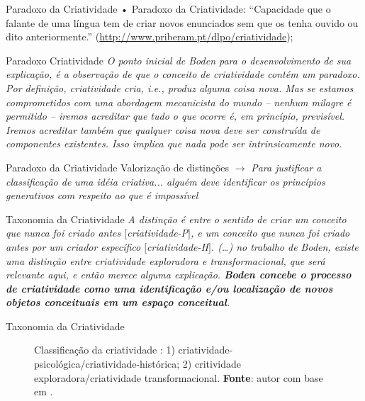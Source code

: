 \documentclass[aspectratio=169]{beamer}
\begin{document}
\begin{frame}{Paradoxo da Criatividade}
• Paradoxo da Criatividade: ``Capacidade que o falante de uma língua tem de criar novos enunciados sem que os tenha ouvido ou dito anteriormente.'' (\url{http://www.priberam.pt/dlpo/criatividade});
\end{frame}

\begin{frame}{Paradoxo Criatividade}
\emph{O ponto inicial de Boden para o desenvolvimento de sua explicação, é a observação de que o conceito de criatividade contém um paradoxo. Por definição, criatividade cria, i.e., produz alguma coisa nova. Mas se estamos comprometidos com uma abordagem mecanicista do mundo -- nenhum milagre é permitido -- iremos acreditar que tudo o que ocorre é, em princípio, previsível. Iremos acreditar também que qualquer coisa nova deve ser construída de componentes existentes. Isso implica que nada pode ser intrinsicamente novo.}\cite[p.~2]{thornton_quantitative_2007}
\end{frame}

\begin{frame}{Paradoxo da Criatividade}
Valorização de distinções $\rightarrow$ \emph{Para justificar a classificação de uma idéia criativa... alguém deve identificar os princípios generativos com respeito ao que é impossível} 
\end{frame}

\begin{frame}{Taxonomia da Criatividade}
\emph{A distinção é entre o sentido de criar um conceito que nunca foi criado antes $[$criatividade-P$]$, e um conceito que nunca foi criado antes por um criador específico $[$criatividade-H$]$. (\ldots) no trabalho de Boden, existe uma distinção entre criatividade exploradora e transformacional, que será relevante aqui, e então merece alguma explicação. \textbf{Boden concebe o processo de criatividade como uma identificação e/ou localização de novos objetos conceituais em um espaço conceitual}.}
\end{frame}

\begin{frame}{Taxonomia da Criatividade}
\begin{figure}
\centering
{}
\caption{Classificação da criatividade : 1) criatividade-psicológica/criatividade-histórica; 2) critividade exploradora/criatividade transformacional. \textbf{Fonte}: autor com base em .}
\label{fig:ortogonal}
\end{figure}
\end{frame}
\end{document}
